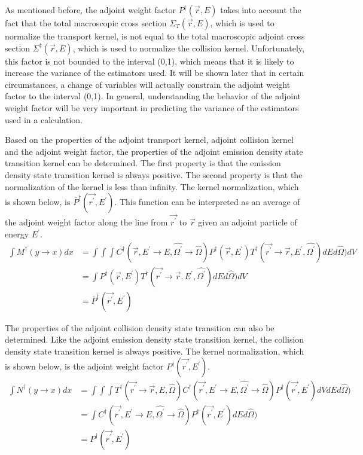 As mentioned before, the adjoint weight factor $P^{\dagger}(\vec{r},E)$ takes 
into account the fact that the total macroscopic cross section 
$\Sigma_T(\vec{r},E)$, which is used to normalize the transport kernel, is not 
equal to the total macroscopic adjoint cross section 
$\Sigma^{\dagger}(\vec{r},E)$, which is used to normalize the collision kernel. 
Unfortunately, this factor is not bounded to the interval (0,1), which means
that it is likely to increase the variance of the estimators used. It will be 
shown later that in certain circumstances, a change of variables will actually 
constrain the adjoint weight factor to the interval (0,1). In general, 
understanding the behavior of the adjoint weight factor will be very important 
in predicting the variance of the estimators used in a calculation.

Based on the properties of the adjoint transport kernel, adjoint collision
kernel and the adjoint weight factor, the properties of the adjoint emission
density state transition kernel can be determined. The first property is that
the emission density state transition kernel is always positive. The second
property is that the normalization of the kernel is less than infinity. The
kernel normalization, which is shown below, is 
$\overline{P}^{\dagger}(\vec{r^{'}},E^{'})$. This function can be interpreted as
an average of the adjoint weight factor along the line from $\vec{r^{'}}$ to
$\vec{r}$ given an adjoint particle of energy $E^{'}$.
\begin{align}
  \int M^{\dagger}(y \to x)dx & = \int\int\int 
  C^{\dagger}(\vec{r},E^{'} \to E,\hat{\Omega^{'}} \to \hat{\Omega})
  P^{\dagger}(\vec{r},E^{'}) 
  T^{\dagger}(\vec{r^{'}} \to \vec{r},E^{'},\hat{\Omega^{'}}) dE d\hat{\Omega}) dV
  \nonumber \\
  & = \int P^{\dagger}(\vec{r},E^{'})
  T^{\dagger}(\vec{r^{'}} \to \vec{r},E^{'},\hat{\Omega^{'}}) dE d\hat{\Omega}) dV
  \nonumber \\
  & = \overline{P}^{\dagger}(\vec{r^{'}},E^{'}) 
\end{align}

The properties of the adjoint collision density state transition can also be
determined. Like the adjoint emission density state transition kernel, the 
collision density state transition kernel is always positive. The kernel
normalization, which is shown below, is the adjoint weight factor 
$P^{\dagger}(\vec{r^{'}},E^{'})$. 
\begin{align}
  \int N^{\dagger}(y \to x)dx & = \int\int\int
  T^{\dagger}(\vec{r^{'}} \to \vec{r},E,\hat{\Omega})
  C^{\dagger}(\vec{r^{'}},E^{'} \to E,\hat{\Omega^{'}} \to \hat{\Omega})
  P^{\dagger}(\vec{r^{'}},E^{'}) dV dE d\hat{\Omega}) 
  \nonumber \\
  & = \int C^{\dagger}(\vec{r^{'}},E^{'} \to E,\hat{\Omega^{'}} \to \hat{\Omega})
  P^{\dagger}(\vec{r^{'}},E^{'}) dE d\hat{\Omega})
  \nonumber \\
  & = P^{\dagger}(\vec{r^{'}},E^{'}) 
\end{align}


